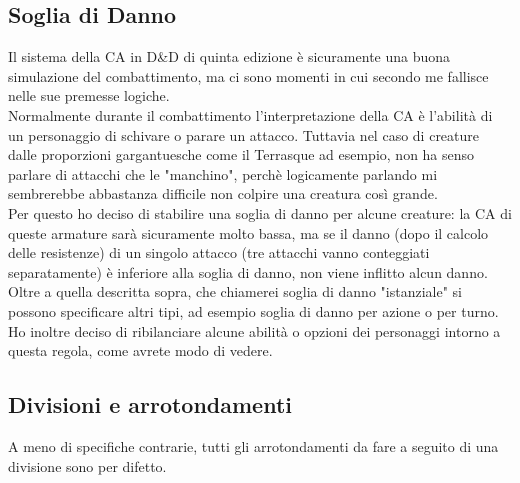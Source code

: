 \subsection{Soglia di Danno}
Il sistema della CA in D\&D di quinta edizione è sicuramente una buona simulazione del combattimento, ma ci sono momenti in cui secondo me fallisce nelle sue premesse logiche. \\ Normalmente durante il combattimento l'interpretazione della CA è l'abilità di un personaggio di schivare o parare un attacco. Tuttavia nel caso di creature dalle proporzioni gargantuesche come il Terrasque ad esempio, non ha senso parlare di attacchi che le "manchino", perchè logicamente parlando mi sembrerebbe abbastanza difficile non colpire una creatura così grande. \\ Per questo ho deciso di stabilire una soglia di danno per alcune creature: la CA di queste armature sarà sicuramente molto bassa, ma se il danno (dopo il calcolo delle resistenze) di un singolo attacco (tre attacchi vanno conteggiati separatamente) è inferiore alla soglia di danno, non viene inflitto alcun danno. \\ Oltre a quella descritta sopra, che chiamerei soglia di danno "istanziale" si possono specificare altri tipi, ad esempio soglia di danno per azione o per turno. \\ Ho inoltre deciso di ribilanciare alcune abilità o opzioni dei personaggi intorno a questa regola, come avrete modo di vedere. 

\subsection{Divisioni e arrotondamenti}
A meno di specifiche contrarie, tutti gli arrotondamenti da fare a seguito di una divisione sono per difetto.

